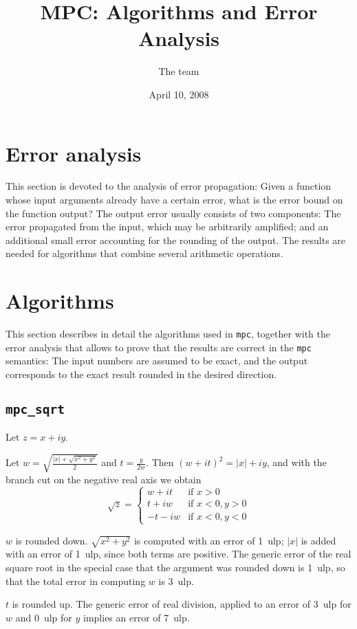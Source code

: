 \documentclass {article}
\title {MPC: Algorithms and Error Analysis}
\author {The {\mpc} team}
\date {April 10, 2008}
\newcommand {\mpc}{\texttt {mpc}}
\newcommand {\ulp}[1]{#1~ulp}
\begin{document}
\maketitle
\tableofcontents


\section {Error analysis}

This section is devoted to the analysis of error propagation: Given a function whose input arguments already have a certain error, what is the error bound on the function output? The output error usually consists of two components: The error propagated from the input, which may be arbitrarily amplified; and an additional small error accounting for the rounding of the output. The results are needed for algorithms that combine several arithmetic operations.


\section {Algorithms}

This section describes in detail the algorithms used in \mpc, together with the error analysis that allows to prove that the results are correct in the {\mpc} semantics: The input numbers are assumed to be exact, and the output corresponds to the exact result rounded in the desired direction.


\subsection {\texttt {mpc\_sqrt}}

Let $z = x + i y$.

Let $w = \sqrt { \frac {|x| + \sqrt {x^2 + y^2}}{2}}$ and
$t = \frac {y}{2w}$. Then $(w + it)^2 = |x| + iy$, and with the branch cut on the negative real axis we obtain
\[
\sqrt z = \left\{
\begin {array}{cl}
w + i t & \text {if } x > 0 \\
t + i w & \text {if } x < 0, y > 0 \\
-t - i w & \text {if } x < 0, y < 0
\end {array}
\right.
\]

$w$ is rounded down. $\sqrt {x^2 + y^2}$ is computed with an error of \ulp{1}; $|x|$ is added with an error of \ulp{1}, since both terms are positive. The generic error of the real square root in the special case that the argument was rounded down is \ulp{1}, so that the total error in computing $w$ is \ulp{3}.

$t$ is rounded up. The generic error of real division, applied to an error of \ulp{3} for $w$ and \ulp{0} for $y$ implies an error of \ulp{7}.
\end{document}
